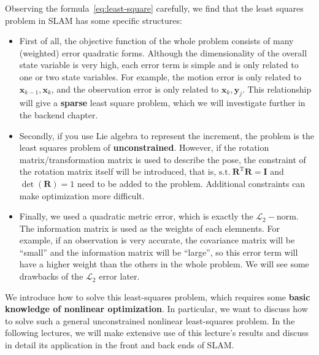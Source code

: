 Observing the formula~\eqref{eq:least-square} carefully, we find that the least squares problem in SLAM has some specific structures:

\begin{itemize}
	\item First of all, the objective function of the whole problem consists of many (weighted) error quadratic forms. Although the dimensionality of the overall state variable is very high, each error term is simple and is only related to one or two state variables. For example, the motion error is only related to $\bm{x}_{k-1}, \bm{x}_k$, and the observation error is only related to $\bm{x}_k, \bm{y}_j$. This relationship will give a \textbf{sparse} least square problem, which we will investigate further in the backend chapter.

	\item Secondly, if you use Lie algebra to represent the increment, the problem is the least squares problem of \textbf{unconstrained}. However, if the rotation matrix/transformation matrix is ​​used to describe the pose, the constraint of the rotation matrix itself will be introduced, that is, $\mathrm{s.t.}\ \bm{R}^\mathrm{T} \bm{R} = \bm{I}$ and $\det (\bm{R})=1$ need to be added to the problem. Additional constraints can make optimization more difficult.

	\item Finally, we used a quadratic metric error, which is exactly the $\mathcal{L}_2-$norm. The information matrix is used as the weights of each elemnents. For example, if an observation is very accurate, the covariance matrix will be ``small'' and the information matrix will be ``large'', so this error term will have a higher weight than the others in the whole problem. We will see some drawbacks of the $\mathcal{L}_2$ error later.
\end{itemize}

We introduce how to solve this least-squares problem, which requires some \textbf{basic knowledge of nonlinear optimization}. In particular, we want to discuss how to solve such a general unconstrained nonlinear least-squares problem. In the following lectures, we will make extensive use of this lecture's results and discuss in detail its application in the front and back ends of SLAM.

